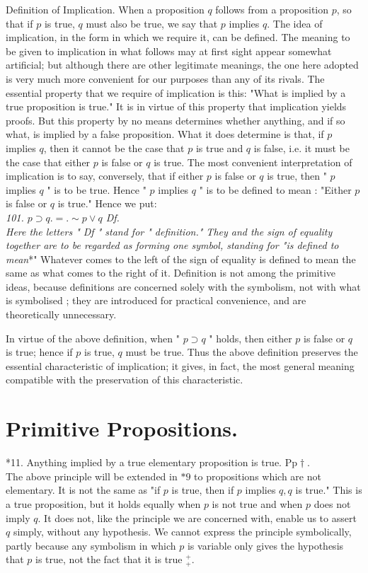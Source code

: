 \documentclass[10pt]{article}
\begin{document}
Definition of Implication. When a proposition $q$ follows from a proposition $p$, so that if $p$ is true, $q$ must also be true, we say that $p$ implies $q$. The idea of implication, in the form in which we require it, can be defined. The meaning to be given to implication in what follows may at first sight appear somewhat artificial; but although there are other legitimate meanings, the one here adopted is very much more convenient for our purposes than any of its rivals. The essential property that we require of implication is this: "What is implied by a true proposition is true." It is in virtue of this property that implication yields proofs. But this property by no means determines whether anything, and if so what, is implied by a false proposition. What it does determine is that, if $p$ implies $q$, then it cannot be the case that $p$ is true and $q$ is false, i.e. it must be the case that either $p$ is false or $q$ is true. The most convenient interpretation of implication is to say, conversely, that if either $p$ is false or $q$ is true, then " $p$ implies $q$ " is to be true. Hence " $p$ implies $q$ " is to be defined to mean : "Either $p$ is false or $q$ is true." Hence we put:\\
\textit{101. $p \supset q .=. \sim p \vee q$ Df.\\
Here the letters " Df " stand for " definition." They and the sign of equality together are to be regarded as forming one symbol, standing for "is defined to mean}*" Whatever comes to the left of the sign of equality is defined to mean the same as what comes to the right of it. Definition is not among the primitive ideas, because definitions are concerned solely with the symbolism, not with what is symbolised ; they are introduced for practical convenience, and are theoretically unnecessary.

In virtue of the above definition, when " $p \supset q$ " holds, then either $p$ is false or $q$ is true; hence if $p$ is true, $q$ must be true. Thus the above definition preserves the essential characteristic of implication; it gives, in fact, the most general meaning compatible with the preservation of this characteristic.

\section*{Primitive Propositions.}
*11. Anything implied by a true elementary proposition is true. $\mathrm{Pp} \dagger$.\\
The above principle will be extended in $* 9$ to propositions which are not elementary. It is not the same as "if $p$ is true, then if $p$ implies $q, q$ is true." This is a true proposition, but it holds equally when $p$ is not true and when $p$ does not imply $q$. It does not, like the principle we are concerned with, enable us to assert $q$ simply, without any hypothesis. We cannot express the principle symbolically, partly because any symbolism in which $p$ is variable only gives the hypothesis that $p$ is true, not the fact that it is true ${ }_{+}^{+}$.
\end{document}
